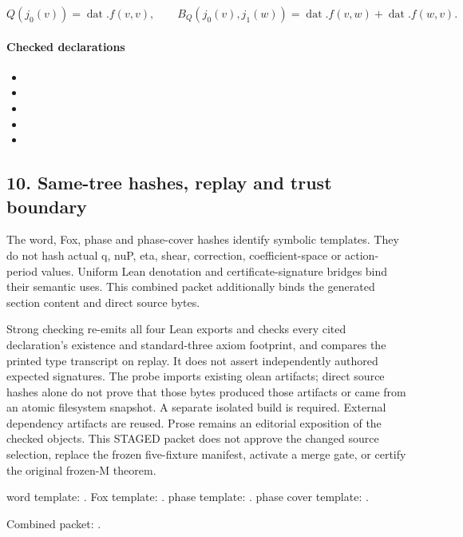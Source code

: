 \[Q(j_0(v))=\operatorname{dat}.f(v,v),\qquad B_Q(j_0(v),j_1(w))=\operatorname{dat}.f(v,w)+\operatorname{dat}.f(w,v).\]
\paragraph{Checked declarations}
\begin{itemize}
\item {}
\item {}
\item {}
\item {}
\item {}
\end{itemize}

\subsection*{10. Same-tree hashes, replay and trust boundary}
The word, Fox, phase and phase-cover hashes identify symbolic templates. They do not hash actual q, nuP, eta, shear, correction, coefficient-space or action-period values. Uniform Lean denotation and certificate-signature bridges bind their semantic uses. This combined packet additionally binds the generated section content and direct source bytes.

Strong checking re-emits all four Lean exports and checks every cited declaration's existence and standard-three axiom footprint, and compares the printed type transcript on replay. It does not assert independently authored expected signatures. The probe imports existing olean artifacts; direct source hashes alone do not prove that those bytes produced those artifacts or came from an atomic filesystem snapshot. A separate isolated build is required. External dependency artifacts are reused. Prose remains an editorial exposition of the checked objects. This STAGED packet does not approve the changed source selection, replace the frozen five-fixture manifest, activate a merge gate, or certify the original frozen-M theorem.

word template: .
Fox template: .
phase template: .
phase cover template: .
\par Combined packet: .
